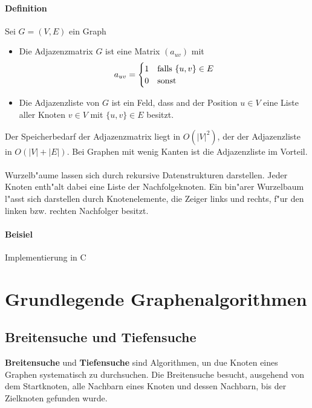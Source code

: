 \paragraph{Definition} Sei $G=(V,E)$ ein Graph
\begin{itemize}
    \item Die Adjazenzmatrix $G$ ist eine Matrix $(a_{uv})$ mit
          \[
            a_{uv}=\begin{cases}
                1 & \text{falls } \{u,v\}\in E\\
                0 & \text{sonst}
            \end{cases}
          \]
    \item Die Adjazenzliste von $G$ ist ein Feld, dass and der Position $u\in V$ eine Liste aller Knoten
          $v\in V$ mit $\{u,v\}\in E$ besitzt.
\end{itemize}

Der Speicherbedarf der Adjazenzmatrix liegt in $O(|V|^2)$, der der Adjazenzliste in $O(|V|+|E|)$. Bei
Graphen mit wenig Kanten ist die Adjazenzliste im Vorteil.\\
\\ %
Wurzelb"aume lassen sich durch rekursive Datenstrukturen darstellen. Jeder Knoten enth"alt dabei eine Liste
der Nachfolgeknoten. Ein bin"arer Wurzelbaum l"asst sich darstellen durch Knotenelemente, die Zeiger links
und rechts, f"ur den linken bzw. rechten Nachfolger besitzt.

\paragraph{Beisiel} Implementierung in C

\section{Grundlegende Graphenalgorithmen}
\subsection{Breitensuche und Tiefensuche}

\textbf{Breitensuche} und \textbf{Tiefensuche} sind Algorithmen, un due Knoten eines Graphen systematisch zu
durchsuchen. Die Breitensuche besucht, ausgehend von dem Startknoten, alle Nachbarn eines Knoten und dessen
Nachbarn, bis der Zielknoten gefunden wurde.

